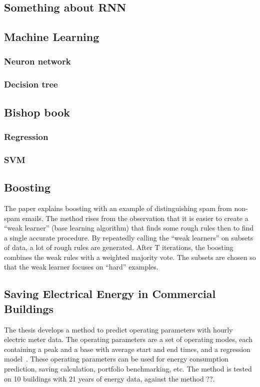 \documentclass[12pt]{article}
\begin{document}
\subsection{Something about RNN}
\subsection{Machine Learning~\cite{mitchell1997machine}}
\subsubsection{Neuron network}
\subsubsection{Decision tree}
\subsection{Bishop book}
\subsubsection{Regression}
\subsubsection{SVM}
\subsection{Boosting}
The paper explains boosting with an example of distinguishing spam
from non-spam emails. The method rises from the observation that it is
easier to create a ``weak learner'' (base learning algorithm) that
finds some rough rules then to find a single accurate procedure. By
repeatedly calling the ``weak learners'' on subsets of data, a lot of
rough rules are generated. After T iterations, the boosting combines
the weak rules with a weighted majority vote. The subsets are chosen
so that the weak learner focuses on ``hard'' examples.
\subsection{Saving Electrical Energy in Commercial Buildings
  ~\cite{case2012saving}}
The thesis develops a method to predict operating parameters with
hourly electric meter data. The operating parameters are a set of
operating modes, each containing a peak and a base with average start
and end times, and a regression model~\cite{case2012saving}. These
operating parameters can be used for energy consumption prediction,
saving calculation, portfolio benchmarking, etc. The method is tested
on 10 buildings with 21 years of energy data, against the method ??.
\end{document}
